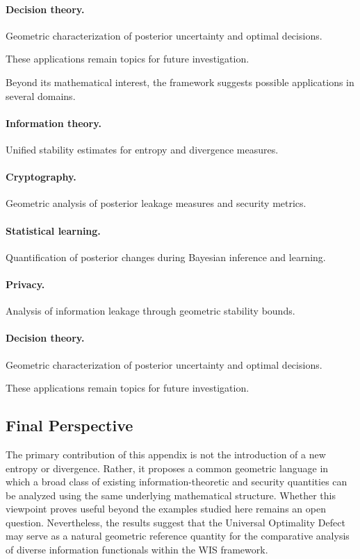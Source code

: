 \paragraph{Decision theory.}
Geometric characterization of posterior uncertainty and optimal
decisions.

These applications remain topics for future investigation.



Beyond its mathematical interest, the framework suggests possible
applications in several domains.

\paragraph{Information theory.}
Unified stability estimates for entropy and divergence measures.

\paragraph{Cryptography.}
Geometric analysis of posterior leakage measures and security metrics.

\paragraph{Statistical learning.}
Quantification of posterior changes during Bayesian inference and
learning.

\paragraph{Privacy.}
Analysis of information leakage through geometric stability bounds.

\paragraph{Decision theory.}
Geometric characterization of posterior uncertainty and optimal
decisions.

These applications remain topics for future investigation.

\subsection{Final Perspective}
The primary contribution of this appendix is not the introduction of a
new entropy or divergence.  Rather, it proposes a common geometric
language in which a broad class of existing information-theoretic and
security quantities can be analyzed using the same underlying
mathematical structure.  Whether this viewpoint proves useful beyond the
examples studied here remains an open question.  Nevertheless, the
results suggest that the Universal Optimality Defect may serve as a
natural geometric reference quantity for the comparative analysis of
diverse information functionals within the WIS framework.



